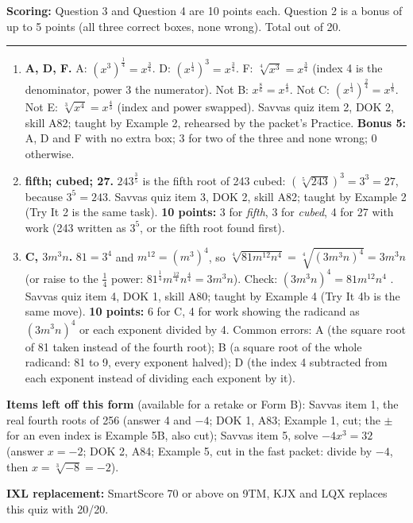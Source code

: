 \documentclass[11pt]{article}
\begin{document}
\vfill
\noindent\textbf{Scoring:} Question 3 and Question 4 are 10 points each. Question 2 is a bonus of up to 5 points (all three correct boxes, none wrong). Total out of 20.

\newpage
{}

\vspace{4pt}\noindent\rule{\textwidth}{0.6pt}

\begin{enumerate}
\item[\textbf{2.}] \textbf{A, D, F.} A: $\left(x^3\right)^{\frac14}=x^{\frac34}$. D: $\left(x^{\frac14}\right)^3=x^{\frac34}$. F: $\sqrt[4]{x^3}=x^{\frac34}$ (index 4 is the denominator, power 3 the numerator). Not B: $x^{\frac86}=x^{\frac43}$. Not C: $\left(x^{\frac14}\right)^{\frac24}=x^{\frac18}$. Not E: $\sqrt[3]{x^4}=x^{\frac43}$ (index and power swapped). Savvas quiz item 2, DOK 2, skill A82; taught by Example 2, rehearsed by the packet's Practice. \textbf{Bonus 5:} A, D and F with no extra box; 3 for two of the three and none wrong; 0 otherwise.
\item[\textbf{3.}] \textbf{fifth; cubed; 27.} $243^{\frac35}$ is the fifth root of 243 cubed: $\left(\sqrt[5]{243}\right)^3=3^3=27$, because $3^5=243$. Savvas quiz item 3, DOK 2, skill A82; taught by Example 2 (Try It 2 is the same task). \textbf{10 points:} 3 for \emph{fifth}, 3 for \emph{cubed}, 4 for 27 with work (243 written as $3^5$, or the fifth root found first).
\item[\textbf{4.}] \textbf{C, $3m^3n$.} $81=3^4$ and $m^{12}=\left(m^3\right)^4$, so $\sqrt[4]{81m^{12}n^4}=\sqrt[4]{\left(3m^3n\right)^4}=3m^3n$ (or raise to the $\frac14$ power: $81^{\frac14}m^{\frac{12}4}n^{\frac44}=3m^3n$). Check: $\left(3m^3n\right)^4=81m^{12}n^4$ \checkmark. Savvas quiz item 4, DOK 1, skill A80; taught by Example 4 (Try It 4b is the same move). \textbf{10 points:} 6 for C, 4 for work showing the radicand as $\left(3m^3n\right)^4$ or each exponent divided by 4. Common errors: A (the square root of 81 taken instead of the fourth root); B (a square root of the whole radicand: 81 to 9, every exponent halved); D (the index 4 subtracted from each exponent instead of dividing each exponent by it).
\end{enumerate}

\textbf{Items left off this form} (available for a retake or Form B): Savvas item 1, the real fourth roots of 256 (answer 4 and $-4$; DOK 1, A83; Example 1, cut; the $\pm$ for an even index is Example 5B, also cut); Savvas item 5, solve $-4x^3=32$ (answer $x=-2$; DOK 2, A84; Example 5, cut in the fast packet: divide by $-4$, then $x=\sqrt[3]{-8}=-2$).

\textbf{IXL replacement:} SmartScore 70 or above on 9TM, KJX and LQX replaces this quiz with 20/20.
\end{document}
